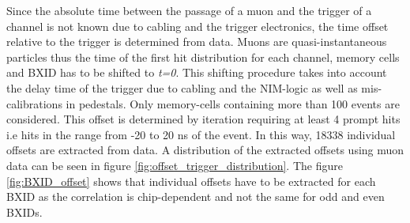 Since the absolute time between the passage of a muon and the trigger of a channel is not known due to cabling and the trigger electronics, the time offset relative to the trigger is determined from data. Muons are quasi-instantaneous particles thus the time of the first hit distribution for each channel, memory cells and BXID has to be shifted to \textit{t=0}. This shifting procedure takes into account the delay time of the trigger due to cabling and the NIM-logic as well as mis-calibrations in pedestals. Only memory-cells containing more than 100 events are considered. This offset is determined by iteration requiring at least 4 prompt hits i.e hits in the range from -20 to 20 ns of the event. In this way, 18338 individual offsets are extracted from data. A distribution of the extracted offsets using muon data can be seen in figure \ref{fig:offset_trigger_distribution}. The figure \ref{fig:BXID_offset} shows that individual offsets have to be extracted for each BXID as the correlation is chip-dependent and not the same for odd and even BXIDs.

